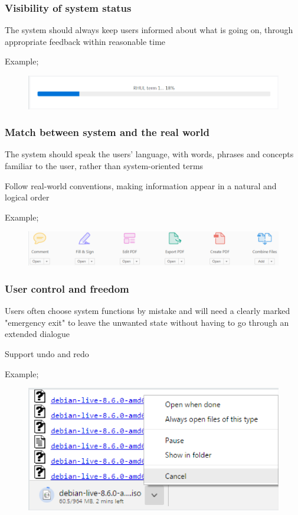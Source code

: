 \documentclass[]{project_plan}
\begin{document}
\subsubsection{Visibility of system status}
The system should always keep users informed about what is going on, through
appropriate feedback within reasonable time

Example;
\begin{figure}[h!]
  \centering
  \includegraphics[width=\linewidth]{visibility_of_system_status_example.png}
\end{figure}

\subsubsection{Match between system and the real world}
The system should speak the users' language, with words, phrases and concepts
familiar to the user, rather than system-oriented terms

Follow real-world conventions, making information appear in a natural and logical
order

Example;
\begin{figure}[h!]
  \centering
  \includegraphics[width=\linewidth]{match_between_system_and_the_real_world_example.png}
\end{figure}

\newpage

\subsubsection{User control and freedom}
Users often choose system functions by mistake and will need a clearly marked
"emergency exit" to leave the unwanted state without having to go through an extended
dialogue

Support undo and redo

Example;
\begin{figure}[h!]
  \centering
  \includegraphics[width=\linewidth]{user_control_and_freedom_example.png}
\end{figure}
\end{document}

